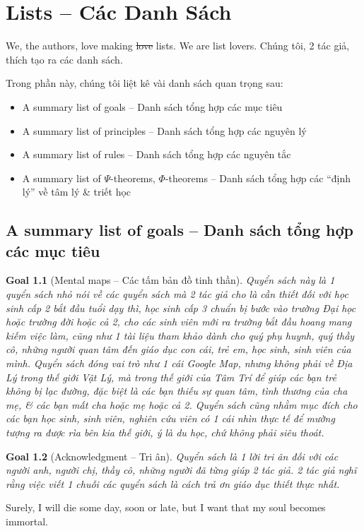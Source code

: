 \documentclass[12pt,oneside]{book}
\newtheorem{goal}{Goal}
\begin{document}

\chapter{Lists -- Các Danh Sách}
\minitoc
We, the authors, love making \st{love} lists. We are list lovers. Chúng tôi, 2 tác giả, thích tạo ra các danh sách.

Trong phần này, chúng tôi liệt kê vài danh sách quan trọng sau:
\begin{itemize}
	\item A summary list of goals -- Danh sách tổng hợp các mục tiêu
	\item A summary list of principles -- Danh sách tổng hợp các nguyên lý
	\item A summary list of rules -- Danh sách tổng hợp các nguyên tắc
	\item A summary list of $\Psi$-theorems, $\Phi$-theorems -- Danh sách tổng hợp các ``định lý'' về tâm lý \& triết học
\end{itemize}

\section{A summary list of goals -- Danh sách tổng hợp các mục tiêu}

\begin{goal}[Mental maps -- Các tấm bản đồ tinh thần]
	Quyển sách này là 1 quyển sách nhỏ nói về các quyển sách mà 2 tác giả cho là cần thiết đối với học sinh cấp 2 bắt đầu tuổi dạy thì, học sinh cấp 3 chuẩn bị bước vào trường Đại học hoặc trường đời hoặc cả 2, cho các sinh viên mới ra trường bắt đầu hoang mang kiếm việc làm, cũng như 1 tài liệu tham khảo dành cho quý phụ huynh, quý thầy cô, những người quan tâm đến giáo dục con cái, trẻ em, học sinh, sinh viên của mình. Quyển sách đóng vai trò như 1 cái Google Map, nhưng không phải về Địa Lý trong thế giới Vật Lý, mà trong thế giới của Tâm Trí để giúp các bạn trẻ không bị lạc đường, đặc biệt là các bạn thiếu sự quan tâm, tình thương của cha mẹ, \& các bạn mất cha hoặc mẹ hoặc cả 2. Quyển sách cũng nhằm mục đích cho các bạn học sinh, sinh viên, nghiên cứu viên có 1 cái nhìn thực tế để mường tượng ra được rìa bên kia thế giới, ý là du học, chứ không phải siêu thoát.
\end{goal}

\begin{goal}[Acknowledgment -- Tri ân]
	Quyển sách là 1 lời tri ân đối với các người anh, người chị, thầy cô, những người đã từng giúp 2 tác giả. 2 tác giả nghĩ rằng việc viết 1 chuỗi các quyển sách là cách trả ơn giáo dục thiết thực nhất.
\end{goal}
Surely, I will die some day, soon or late, but I want that my soul becomes immortal.
\end{document}

